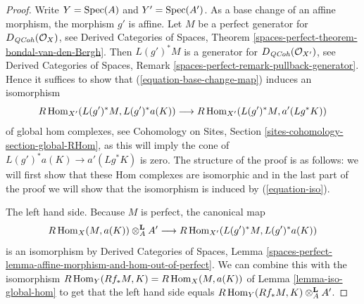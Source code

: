 \begin{proof}
Write $Y = \mathop{\mathrm{Spec}}(A)$ and $Y' = \mathop{\mathrm{Spec}}(A')$. As a base change of an affine
morphism, the morphism $g'$ is affine. Let $M$ be a perfect generator
for $D_{\mathit{QCoh}}(\mathcal{O}_X)$, see Derived Categories of Spaces, Theorem
\ref{spaces-perfect-theorem-bondal-van-den-Bergh}. Then $L(g')^*M$ is a
generator for $D_{\mathit{QCoh}}(\mathcal{O}_{X'})$, see
Derived Categories of Spaces, Remark
\ref{spaces-perfect-remark-pullback-generator}.
Hence it suffices to show that (\ref{equation-base-change-map})
induces an isomorphism
\begin{equation}
\label{equation-iso}
R\mathop{\mathrm{Hom}}\nolimits_{X'}(L(g')^*M, L(g')^*a(K))
\longrightarrow
R\mathop{\mathrm{Hom}}\nolimits_{X'}(L(g')^*M, a'(Lg^*K))
\end{equation}
of global hom complexes, see
Cohomology on Sites, Section \ref{sites-cohomology-section-global-RHom},
as this will imply the cone of $L(g')^*a(K) \to a'(Lg^*K)$
is zero.
The structure of the proof is as follows: we will first show that
these Hom complexes are isomorphic and in the last part of the proof
we will show that the isomorphism is induced by (\ref{equation-iso}).

\medskip\noindent
The left hand side. Because $M$ is perfect, the canonical map
$$
R\mathop{\mathrm{Hom}}\nolimits_X(M, a(K)) \otimes^\mathbf{L}_A A'
\longrightarrow
R\mathop{\mathrm{Hom}}\nolimits_{X'}(L(g')^*M, L(g')^*a(K))
$$
is an isomorphism by Derived Categories of Spaces, Lemma
\ref{spaces-perfect-lemma-affine-morphism-and-hom-out-of-perfect}.
We can combine this with the isomorphism
$R\mathop{\mathrm{Hom}}\nolimits_Y(Rf_*M, K) = R\mathop{\mathrm{Hom}}\nolimits_X(M, a(K))$
of Lemma \ref{lemma-iso-global-hom}
to get that the left hand side equals
$R\mathop{\mathrm{Hom}}\nolimits_Y(Rf_*M, K) \otimes^\mathbf{L}_A A'$.


\end{proof}
